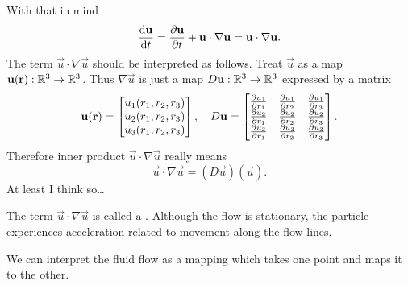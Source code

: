   

  With that in mind
  \begin{displaymath}
    \frac{\mathrm{d} \mathbf{u}}{\mathrm{d} t} = \frac{\partial \mathbf{u}}{\partial t} + \mathbf{u} \cdot \nabla \mathbf{u} = \mathbf{u} \cdot \nabla \mathbf{u}.
  \end{displaymath}
  The term $\vec u \cdot \nabla \vec u$ should be interpreted as follows.
  Treat $\vec u$ as a map $\mathbf{u}(\mathbf{r}): \mathbb{R}^3 \rightarrow \mathbb{R}^3$. 
  Thus $\nabla \vec u$ is just a map $D \mathbf{u}: \mathbb{R}^3 \rightarrow \mathbb{R}^3$ expressed by a matrix
  \begin{displaymath}
    \mathbf{u}(\mathbf{r}) = \begin{bmatrix}
      u_1 (r_1, r_2, r_3)\\
      u_2 (r_1, r_2, r_3)\\
      u_3 (r_1, r_2, r_3)
    \end{bmatrix}, \quad 
    D \mathbf{u} = \begin{bmatrix}
      \frac{\partial u_1}{\partial r_1} & \frac{\partial u_1}{\partial r_2} & \frac{\partial u_1}{\partial r_3} \\
      \frac{\partial u_2}{\partial r_1} & \frac{\partial u_2}{\partial r_2} & \frac{\partial u_2}{\partial r_3} \\
      \frac{\partial u_3}{\partial r_1} & \frac{\partial u_3}{\partial r_2} & \frac{\partial u_3}{\partial r_3}
    \end{bmatrix}.
  \end{displaymath}
  Therefore inner product $\vec u \cdot \nabla \vec u$ really means
  \begin{displaymath}
    \vec u \cdot \nabla \vec u = (D \vec u)(\vec u).
  \end{displaymath}
  At least I think so\dots
  

  
  The term $\vec u \cdot \nabla \vec u$ is called a .
  Although the flow is stationary, the particle experiences acceleration related to movement along the flow lines. 
  
  
  We can interpret the fluid flow as a mapping which takes one point and maps it to the other.

  \begin{figure}
    \centering
    \label{fig:1.10}
  \end{figure}

